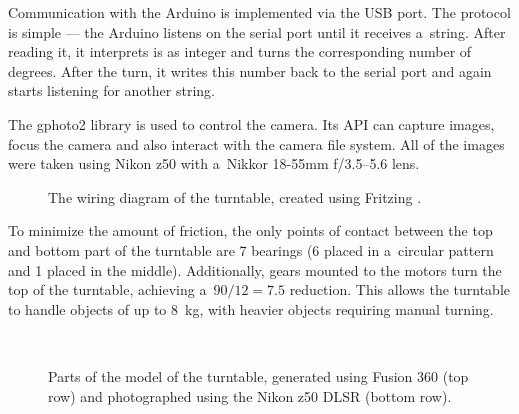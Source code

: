 Communication with the Arduino is implemented via the USB port.
The protocol is simple --- the Arduino listens on the serial port until it receives a~string.
After reading it, it interprets is as integer and turns the corresponding number of degrees.
After the turn, it writes this number back to the serial port and again starts listening for another string.

The gphoto2 \cite{gphoto2} library is used to control the camera.
Its API can capture images, focus the camera and also interact with the camera file system.
All of the images were taken using Nikon z50 with a~Nikkor 18-55mm f/3.5--5.6 lens.

\begin{figure}[!b]
	\centering
	
	\caption{The wiring diagram of the turntable, created using Fritzing \cite{fritzing}.}
	\label{fig:wiring}
\end{figure}

To minimize the amount of friction, the only points of contact between the top and bottom part of the turntable are 7 bearings (6 placed in a~circular pattern and 1 placed in the middle).
Additionally, gears mounted to the motors turn the top of the turntable, achieving a~$90/12 = 7.5$ reduction.
This allows the turntable to handle objects of up to \SI{8}{\kilo\gram}, with heavier objects requiring manual turning.

\begin{figure}[t]
	\centering
	\hfill
	\hfill
	\\
	\hfill
	\hfill
	\hspace{1.2em}
	\caption{Parts of the model of the turntable, generated using Fusion 360 (top row) and photographed using the Nikon z50 DLSR (bottom row). }%
	\label{fig:turntable}
\end{figure}

